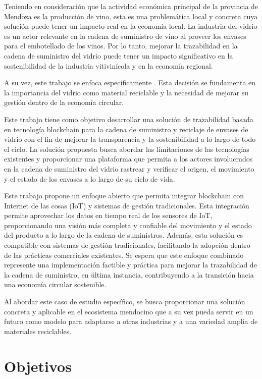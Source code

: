 Teniendo en consideración que la actividad económica principal de la provincia de Mendoza es la producción de vino, esta es una problemática local y concreta cuya solución puede tener un impacto real en la economía local. La industria del vidrio es un actor relevante en la cadena de suministro de vino al proveer los envases para el embotellado de los vinos. Por lo tanto, mejorar la trazabilidad en la cadena de suministro del vidrio puede tener un impacto significativo en la sostenibilidad de la industria vitivinícola y en la economía regional. 

A su vez, este trabajo se enfoca específicamente . Esta decisión se fundamenta en la importancia del vidrio como material reciclable y la necesidad de mejorar su gestión dentro de la economía circular. 

Este trabajo tiene como objetivo desarrollar una solución de trazabilidad basada en tecnología blockchain para la cadena de suministro y reciclaje de envases de vidrio con el fin de mejorar la transparencia y la sostenibilidad a lo largo de todo el ciclo. La solución propuesta busca abordar las limitaciones de las tecnologías existentes y proporcionar una plataforma que permita a los actores involucrados en la cadena de suministro del vidrio rastrear y verificar el origen, el movimiento y el estado de los envases a lo largo de su ciclo de vida.

Este trabajo propone un enfoque abierto que permita integrar blockchain con Internet de las cosas (IoT) y sistemas de gestión tradicionales. Esta integración permite aprovechar los datos en tiempo real de los sensores de IoT, proporcionando una visión más completa y confiable del movimiento y el estado del producto a lo largo de la cadena de suministros. Además, esta solución es compatible con sistemas de gestión tradicionales, facilitando la adopción dentro de las prácticas comerciales existentes. Se espera que este enfoque combinado represente una implementación factible y práctica para mejorar la trazabilidad de la cadena de suministro, en última instancia, contribuyendo a la transición hacia una economía circular sostenible.

Al abordar este caso de estudio específico, se busca proporcionar una solución concreta y aplicable en el ecosistema mendocino que a su vez pueda servir en un futuro como modelo para adaptarse a  otras industrias y a una variedad amplia de materiales reciclables.

\section{Objetivos}

